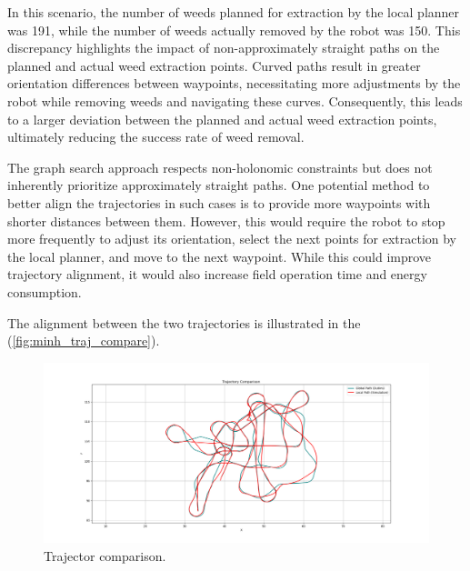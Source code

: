 In this scenario, the number of weeds planned for extraction by the local planner was 191, while the number of weeds actually removed by the robot was 150. This discrepancy highlights the impact of non-approximately straight paths on the planned and actual weed extraction points. Curved paths result in greater orientation differences between waypoints, necessitating more adjustments by the robot while removing weeds and navigating these curves. Consequently, this leads to a larger deviation between the planned and actual weed extraction points, ultimately reducing the success rate of weed removal.

\vspace{3mm}   

The graph search approach respects non-holonomic constraints but does not inherently prioritize approximately straight paths. One potential method to better align the trajectories in such cases is to provide more waypoints with shorter distances between them. However, this would require the robot to stop more frequently to adjust its orientation, select the next points for extraction by the local planner, and move to the next waypoint. While this could improve trajectory alignment, it would also increase field operation time and energy consumption.


The alignment between the two trajectories is illustrated in the (\autoref{fig:minh_traj_compare}). 


\begin{figure}[htbp]
    \centering
    \includegraphics[width=\textwidth]{Images/real_robot/minhs_traj_2_better.png} 
    \caption{Trajector comparison.}
    \label{fig:minh_traj_compare}
\end{figure} 


